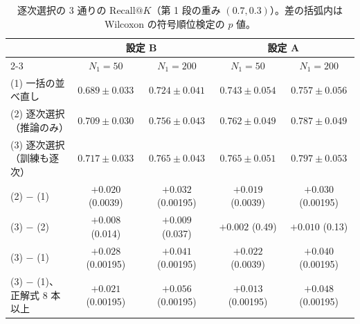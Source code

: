 \documentclass[11pt,a4paper]{ltjsarticle}
\makeatletter
\newcommand{\rk}{\textrm{Recall@}K}
\makeatother
\begin{document}
\begin{table}[h]\centering
\caption{逐次選択の 3 通りの $\rk$（第 1 段の重み $(0.7, 0.3)$）。差の括弧内は Wilcoxon の符号順位検定の $p$ 値。}
\label{tab:k50}
\footnotesize
\setlength{\tabcolsep}{3.5pt}
\begin{tabular}{@{}lcccc@{}}
\toprule
 & \multicolumn{2}{c}{設定 B} & \multicolumn{2}{c}{設定 A} \\
\cmidrule{2-3}\cmidrule{4-5}
 & $N_1 = 50$ & $N_1 = 200$ & $N_1 = 50$ & $N_1 = 200$ \\
\midrule
(1) 一括の並べ直し & $0.689 \pm 0.033$ & $0.724 \pm 0.041$ & $0.743 \pm 0.054$ & $0.757 \pm 0.056$ \\
(2) 逐次選択（推論のみ） & $0.709 \pm 0.030$ & $0.756 \pm 0.043$ & $0.762 \pm 0.049$ & $0.787 \pm 0.049$ \\
(3) 逐次選択（訓練も逐次） & $0.717 \pm 0.033$ & $0.765 \pm 0.043$ & $0.765 \pm 0.051$ & $0.797 \pm 0.053$ \\
\midrule
(2) $-$ (1) & $+0.020$ (0.0039) & $+0.032$ (0.00195) & $+0.019$ (0.0039) & $+0.030$ (0.00195) \\
(3) $-$ (2) & $+0.008$ (0.014) & $+0.009$ (0.037) & $+0.002$ (0.49) & $+0.010$ (0.13) \\
(3) $-$ (1) & $+0.028$ (0.00195) & $+0.041$ (0.00195) & $+0.022$ (0.0039) & $+0.040$ (0.00195) \\
(3) $-$ (1)、正解式 8 本以上 & $+0.021$ (0.00195) & $+0.056$ (0.00195) & $+0.013$ (0.00195) & $+0.048$ (0.00195) \\
\bottomrule
\end{tabular}
\end{table}
\end{document}
